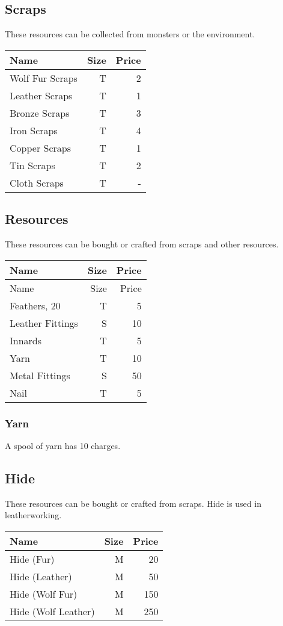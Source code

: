 \subsection{Scraps}\label{subsec:scraps}
These resources can be collected from monsters or the environment.
\begin{longtable}{l | r | r }
	Name & Size & Price\\ \hline
	Wolf Fur Scraps & T & 2\\
	Leather Scraps & T & 1\\
	Bronze Scraps & T & 3\\
	Iron Scraps & T & 4\\
	Copper Scraps & T & 1\\
	Tin Scraps & T & 2\\
	Cloth Scraps & T & -\\
\end{longtable}

\subsection{Resources}\label{subsec:resources}
These resources can be bought or crafted from scraps and other resources.
\begin{longtable}{l | r | r }
	Name & Size & Price\\ \hline
	Name & Size & Price\\ \hline
	Feathers, 20 & T & 5\\
	Leather Fittings & S & 10\\
	Innards & T & 5\\
	Yarn & T & 10\\
	Metal Fittings & S & 50\\
	Nail & T & 5\\
\end{longtable}

\subsubsection{Yarn}
A spool of yarn has 10 charges.

\subsection{Hide}\label{subsec:hide}
These resources can be bought or crafted from scraps.
Hide is used in leatherworking.
\begin{longtable}{l | r | r }
	Name & Size & Price\\ \hline
	Hide (Fur) & M & 20\\
	Hide (Leather) & M & 50\\
	Hide (Wolf Fur) & M & 150\\
	Hide (Wolf Leather) & M & 250\\
\end{longtable}

